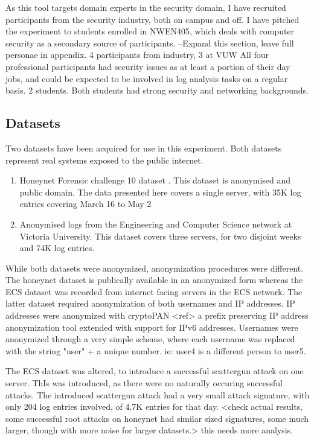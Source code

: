 As this tool targets domain experts in the security domain, I have recruited participants from the security industry, both on campus and off. I have pitched the experiment to students enrolled in NWEN405, which deals with computer security as a secondary source of participants.
--Expand this section, leave full personae in appendix.
4 participants from industry, 3 at VUW
All four professional participants had security issues as at least a portion of their day jobs, and could be expected to be involved in log analysis tasks on a regular basis.
2 students.  Both students had strong security and networking backgrounds.

\subsection{Datasets}\label{data}

Two datasets have been acquired for use in this experiment. Both datasets represent real systems exposed to the public internet. 
\begin{enumerate}
\item{Honeynet Forensic challenge 10 dataset \cite{forensic10}. This dataset is anonymised and public domain. The data presented here covers a single server, with 35K log entries covering March 16 to May 2}
\item{Anonymised logs from the Engineering and Computer Science network at Victoria University. This dataset covers three servers, for two disjoint weeks and 74K log entries.}
\end{enumerate}

While both datasets were anonymized, anonymization procedures were different. The honeynet dataset is publically available in an anonymized form \cite{forensic10} whereas the ECS dataset was recorded from internet facing servers in the ECS network. The latter dataset required anonymization of both usernames and IP addresses. IP addresses were anonymized with cryptoPAN <ref> a prefix preserving IP address anonymization tool extended with support for IPv6 addresses. Usernames were anonymized through a very simple scheme, where each username was replaced with the string "user" + a unique number. ie: user4 is a different person to user5.

The ECS dataset was altered, to introduce a successful scattergun attack on one server. ThIs was introduced, as there were no naturally occuring successful attacks.  The introduced scattergun attack had a very small attack signature, with only 204 log entries involved, of 4.7K entries for that day.
<check actual results, some successful root attacks on honeynet had similar sized signatures, some much larger, though with more noise for larger datasets.>
this needs more analysis.

